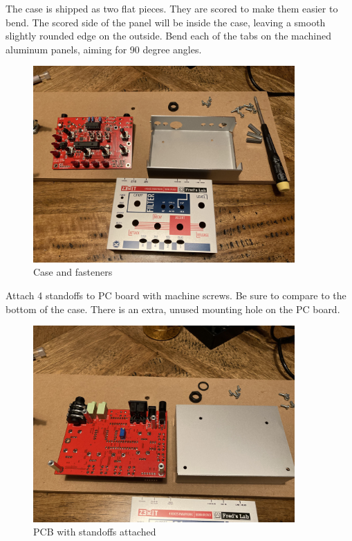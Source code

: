 \documentclass{scrartcl}
\begin{document}
The case is shipped as two flat pieces. They are scored to make them easier to bend. The scored side of the panel will be inside the case,
leaving a smooth slightly rounded edge on the outside. Bend each of the tabs on the machined aluminum panels, aiming for 90 degree angles.

\begin{figure}[!htbp]
    \begin{center}
        \includegraphics[width=100mm]{assets/case-pieces.jpg}
        \caption{Case and fasteners}
    \end{center}
\end{figure}

Attach 4 standoffs to PC board with machine screws. Be sure to compare to the bottom of the case. There is an extra, unused mounting hole on the PC board.

\begin{figure}[!htbp]
    \begin{center}
        \includegraphics[width=100mm]{assets/case-standoffs.jpg}
        \caption{PCB with standoffs attached}
    \end{center}
\end{figure}
\end{document}
